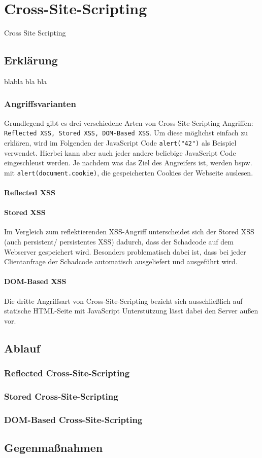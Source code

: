 \chapter{Cross-Site-Scripting}
\label{XSS}
Cross Site Scripting
\section{Erklärung}
blabla bla bla \\ 

\subsection{Angriffsvarianten}
Grundlegend gibt es drei verschiedene Arten von Cross-Site-Scripting Angriffen: \colorbox{altgray}{\lstinline|Reflected XSS, Stored XSS, DOM-Based XSS|}. Um diese möglichst einfach zu erklären, wird im Folgenden der JavaScript Code \colorbox{altgray}{\lstinline|alert("42")|} als Beispiel verwendet. Hierbei kann aber auch jeder andere beliebige JavaScript Code eingeschleust werden. Je nachdem was das Ziel des Angreifers ist, werden bspw. mit \colorbox{altgray}{\lstinline|alert(document.cookie)|}, die gespeicherten Cookies der Webseite auslesen. \\ 
\subsubsection*{Reflected XSS}
\subsubsection*{Stored XSS}
Im Vergleich zum reflektierenden XSS-Angriff unterscheidet sich der Stored XSS (auch persistent/ persistentes XSS) dadurch, dass der Schadcode auf dem Webserver gespeichert wird. Besonders problematisch dabei ist, dass bei jeder Clientanfrage der Schadcode automatisch ausgeliefert und ausgeführt wird. \\ 
\subsubsection*{DOM-Based XSS}
Die dritte Angriffsart von Cross-Site-Scripting bezieht sich ausschließlich auf statische HTML-Seite mit JavaScript Unterstützung lässt dabei den Server außen vor. 


\section{Ablauf}
\subsection{Reflected Cross-Site-Scripting}
\subsection{Stored Cross-Site-Scripting}
\subsection{DOM-Based Cross-Site-Scripting}

\section{Gegenmaßnahmen}

